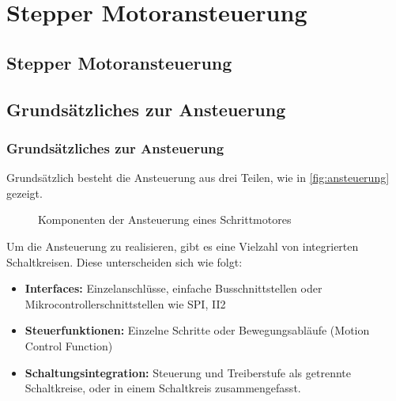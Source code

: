 \ifSTANDALONE
\section{Stepper Motoransteuerung}
\fi
\ifEMBED
\subsection{Stepper Motoransteuerung}
\fi

\ifEMBED
    \BLDCcollab
\fi
\ifSTANDALONE
    \subsection{Grundsätzliches zur Ansteuerung}\label{subsec:Ansteuerung}
\fi
\ifEMBED
    \subsubsection{Grundsätzliches zur Ansteuerung}\label{subsec:Ansteuerung}
\fi
	Grundsätzlich besteht die Ansteuerung aus drei Teilen, wie in 
    \autoref*{fig:ansteuerung} gezeigt. 
	\begin{figure}[h!]
		\centering
		\caption{Komponenten der Ansteuerung eines Schrittmotores}
		\label{fig:ansteuerung}
	\end{figure}
    Um die Ansteuerung zu realisieren, gibt es eine Vielzahl von 
    integrierten Schaltkreisen. Diese unterscheiden sich wie folgt: 
    \begin{itemize}
    	\item \textbf{Interfaces:} Einzelanschlüsse, einfache 
            Busschnittstellen oder Mikrocontrollerschnittstellen wie SPI, 
            II2
    	\item \textbf{Steuerfunktionen:} Einzelne Schritte oder 
            Bewegungsabläufe (Motion Control Function)
    	\item \textbf{Schaltungsintegration:} Steuerung und Treiberstufe als 
            getrennte Schaltkreise, oder in einem Schaltkreis zusammengefasst. 
    \end{itemize}
    \cite{Doku:Stepper} 
    
